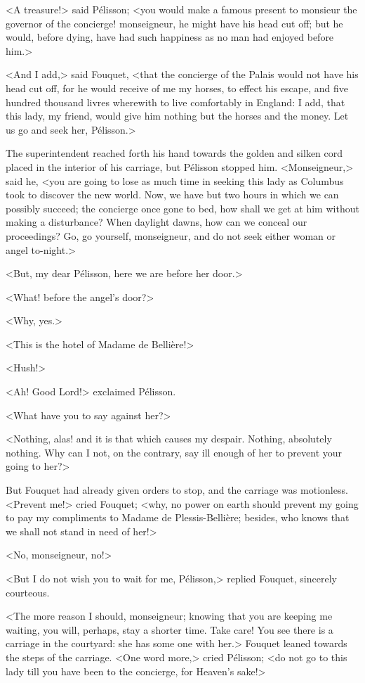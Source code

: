 <A treasure!> said Pélisson; <you would make a famous present to monsieur the governor of the concierge!  monseigneur, he might have his head cut off; but he would, before dying, have had such happiness as no man had enjoyed before him.>

<And I add,> said Fouquet, <that the concierge of the Palais would not have his head cut off, for he would receive of me my horses, to effect his escape, and five hundred thousand livres wherewith to live comfortably in England: I add, that this lady, my friend, would give him nothing but the horses and the money. Let us go and seek her, Pélisson.>

The superintendent reached forth his hand towards the golden and silken cord placed in the interior of his carriage, but Pélisson stopped him. <Monseigneur,> said he, <you are going to lose as much time in seeking this lady as Columbus took to discover the new world. Now, we have but two hours in which we can possibly succeed; the concierge once gone to bed, how shall we get at him without making a disturbance? When daylight dawns, how can we conceal our proceedings? Go, go yourself, monseigneur, and do not seek either woman or angel to-night.>

<But, my dear Pélisson, here we are before her door.>

<What! before the angel's door?>

<Why, yes.>

<This is the hotel of Madame de Bellière!>

<Hush!>

<Ah! Good Lord!> exclaimed Pélisson.

<What have you to say against her?>

<Nothing, alas! and it is that which causes my despair. Nothing, absolutely nothing. Why can I not, on the contrary, say ill enough of her to prevent your going to her?>

But Fouquet had already given orders to stop, and the carriage was motionless. <Prevent me!> cried Fouquet; <why, no power on earth should prevent my going to pay my compliments to Madame de Plessis-Bellière; besides, who knows that we shall not stand in need of her!>

<No, monseigneur, no!>

<But I do not wish you to wait for me, Pélisson,> replied Fouquet, sincerely courteous.

<The more reason I should, monseigneur; knowing that you are keeping me waiting, you will, perhaps, stay a shorter time. Take care! You see there is a carriage in the courtyard: she has some one with her.> Fouquet leaned towards the steps of the carriage. <One word more,> cried Pélisson; <do not go to this lady till you have been to the concierge, for Heaven's sake!>


